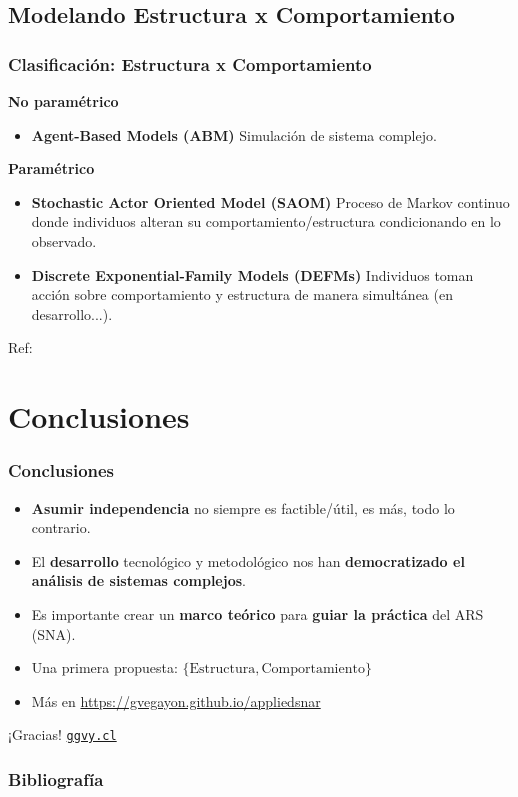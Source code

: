 \documentclass[aspectratio=169,10pt]{beamer}
\begin{document}
\subsection{Modelando Estructura x Comportamiento}

\begin{frame}
	\frametitle{Clasificación: Estructura x Comportamiento}
\pause
	\textbf{No paramétrico}
	\begin{itemize}
		\item \textbf{Agent-Based Models (ABM)} Simulación de sistema complejo.
	\end{itemize}
\pause
	\textbf{Paramétrico}
	\begin{itemize}
		\item \textbf{Stochastic Actor Oriented Model (SAOM)} Proceso de Markov continuo donde individuos alteran su comportamiento/estructura condicionando en lo observado.
		\item \textbf{Discrete Exponential-Family Models (DEFMs)} Individuos toman acción sobre comportamiento y estructura de manera simultánea (en desarrollo...).
	\end{itemize}

Ref: \textcite{Tisue2004,Snijders2010intro}

\end{frame}

\section{Conclusiones}

\begin{frame}
	\frametitle{Conclusiones}
	\pause
	\begin{itemize}
		\item \textbf{Asumir independencia} no siempre es factible/útil, es más, todo lo contrario.\pause
		\item El \textbf{desarrollo} tecnológico y metodológico nos han \textbf{democratizado el análisis de sistemas complejos}.\pause
		\item Es importante crear un \textbf{marco teórico} para \textbf{guiar la práctica} del ARS (SNA).\pause
		\item Una primera propuesta: $\{\mbox{Estructura},\mbox{Comportamiento}\}$\pause
		\item Más en \url{https://gvegayon.github.io/appliedsnar}
	\end{itemize}
\end{frame}

\begin{frame}
	\centering
	\Huge ¡Gracias! \normalsize 
\titlepage%
\vfill\hfill  \href{https://ggvy.cl}{\texttt{ggvy.cl}}
\end{frame}

\begin{frame}[allowframebreaks=1]
	\frametitle{Bibliografía}
	\printbibliography
\end{frame}
\end{document}

